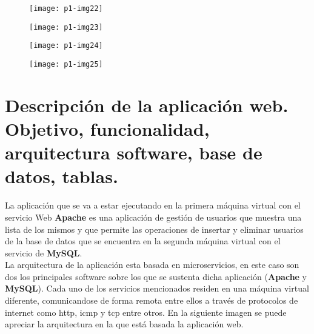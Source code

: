 \documentclass[10pt]{article}
\begin{document}
\begin{figure}[H]
	\begin{center}
 		\texttt{[image: p1-img22]}
	\end{center} 
\end{figure}

\begin{figure}[H]
	\begin{center}
 		\texttt{[image: p1-img23]}
	\end{center} 
\end{figure}

\begin{figure}[H]
	\begin{center}
 		\texttt{[image: p1-img24]}
	\end{center} 
\end{figure}

\begin{figure}[H]
	\begin{center}
 		\texttt{[image: p1-img25]}
	\end{center} 
\end{figure}



\section{Descripción de la aplicación web. Objetivo, funcionalidad, arquitectura software, base de datos, tablas.}
La aplicación que se va a estar ejecutando en la primera máquina virtual con el servicio Web \textbf{Apache} es una aplicación de gestión de usuarios que muestra una lista de los mismos y que permite las operaciones de insertar y eliminar usuarios de la base de datos que se encuentra en la segunda máquina virtual con el servicio de \textbf{MySQL}.\\

La arquitectura de la aplicación esta basada en microservicios, en este caso son dos los principales software sobre los que se sustenta dicha aplicación (\textbf{Apache} y \textbf{MySQL}). Cada uno de los servicios mencionados residen en una máquina virtual diferente, comunicandose de forma remota entre ellos a través de protocolos de internet como http, icmp y tcp entre otros. En la siguiente imagen se puede apreciar la arquitectura en la que está basada la aplicación web.\\ \\
\end{document}
